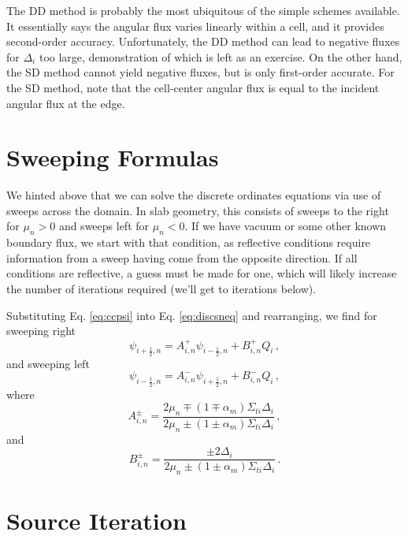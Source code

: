 The DD method is probably the most ubiquitous of the simple schemes available.  It essentially says the angular flux varies linearly within a cell, and it provides second-order accuracy.  Unfortunately, the DD method can lead to negative fluxes for $\Delta_i$ too large, demonstration of which is left as an exercise.  On the other hand, the SD method cannot yield negative fluxes, but is only first-order accurate.  For the SD method, note that the cell-center angular flux is equal to the incident angular flux at the edge.

\section*{Sweeping Formulas}

We hinted above that we can solve the discrete ordinates equations via use of sweeps across the domain.  In slab geometry, this consists of sweeps to the right for $\mu_n > 0$ and sweeps left for $\mu_n < 0$.  If we have vacuum or some other known boundary flux, we start with that condition, as reflective conditions require information from a sweep having come from the opposite direction.  If all conditions are reflective, a guess must be made for one, which will likely increase the number of iterations required (we'll get to iterations below).

Substituting Eq. \ref{eq:ccpsi} into Eq. \ref{eq:discsneq} and rearranging, we find for sweeping right
\begin{equation}
 \psi_{i+\frac{1}{2},n} = A^+_{i,n} \psi_{i-\frac{1}{2},n} + B^+_{i,n} Q_i \, ,
 \label{eq:rightsweep}
\end{equation}
and sweeping left
\begin{equation}
 \psi_{i-\frac{1}{2},n} = A^-_{i,n} \psi_{i+\frac{1}{2},n} + B^-_{i,n} Q_i \, , 
 \label{eq:leftsweep}
\end{equation}
where
\begin{equation}
 A^{\pm}_{i,n} = \frac{2\mu_n \mp (1 \mp \alpha_m)\Sigma_{ti}\Delta_i}{2\mu_n \pm (1 \pm \alpha_m)\Sigma_{ti}\Delta_i} \, , 
 \label{eq:Aconstant}
\end{equation}
and
\begin{equation}
 B^{\pm}_{i,n} = \frac{\pm 2 \Delta_i}{2\mu_n \pm (1 \pm \alpha_m)\Sigma_{ti}\Delta_i} \, .
 \label{eq:Bconstant}
\end{equation}

\section*{Source Iteration}

